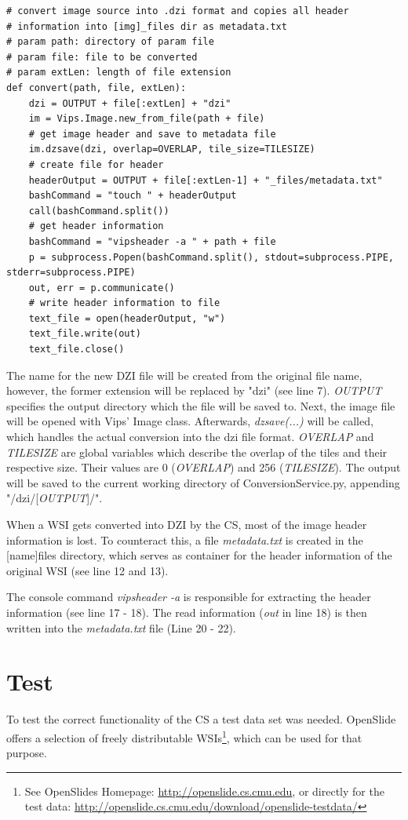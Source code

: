 \begin{lstlisting}[frame=single]
# convert image source into .dzi format and copies all header 
# information into [img]_files dir as metadata.txt
# param path: directory of param file
# param file: file to be converted
# param extLen: length of file extension
def convert(path, file, extLen):
	dzi = OUTPUT + file[:extLen] + "dzi"
	im = Vips.Image.new_from_file(path + file)
	# get image header and save to metadata file
	im.dzsave(dzi, overlap=OVERLAP, tile_size=TILESIZE)
	# create file for header
	headerOutput = OUTPUT + file[:extLen-1] + "_files/metadata.txt"
	bashCommand = "touch " + headerOutput
	call(bashCommand.split())
	# get header information
	bashCommand = "vipsheader -a " + path + file
	p = subprocess.Popen(bashCommand.split(), stdout=subprocess.PIPE, stderr=subprocess.PIPE)
	out, err = p.communicate()
	# write header information to file
	text_file = open(headerOutput, "w")
	text_file.write(out)
	text_file.close()
\end{lstlisting}

The name for the new DZI file will be created from the original file name, however, the former extension will be replaced by "dzi" (see line 7). \emph{OUTPUT} specifies the output directory which the file will be saved to. Next, the image file will be opened with Vips' Image class. Afterwards, \emph{dzsave(...)} will be called, which handles the actual conversion into the dzi file format. \emph{OVERLAP} and \emph{TILESIZE} are global variables which describe the overlap of the tiles and their respective size. Their values are 0 (\emph{OVERLAP}) and 256 (\emph{TILESIZE}). The output will be saved to the current working directory of ConversionService.py, appending "/dzi/[\emph{OUTPUT}]/".

When a WSI gets converted into DZI by the CS, most of the image header information is lost. To counteract this, a file \emph{metadata.txt} is created in the [name]{\textunderscore}files directory, which serves as container for the header information of the original WSI (see line 12 and 13).

The console command \emph{vipsheader -a} is responsible for extracting the header information (see line 17 - 18). The read information (\emph{out} in line 18) is then written into the \emph{metadata.txt} file (Line 20 - 22).


\section{Test}
To test the correct functionality of the CS a test data set was needed. OpenSlide offers a selection of freely distributable WSIs\footnote{See OpenSlides Homepage: \url{http://openslide.cs.cmu.edu}, or directly for the test data: \url{http://openslide.cs.cmu.edu/download/openslide-testdata/}}, which can be used for that purpose.

